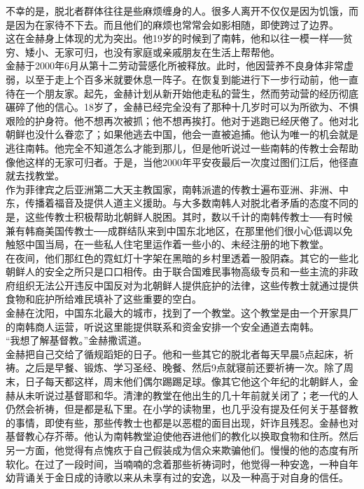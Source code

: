 不幸的是，脱北者群体往往是些麻烦缠身的人。很多人离开不仅仅是因为饥饿，而是因为在家待不下去。而且他们的麻烦也常常会如影相随，即使跨过了边界。\\

这在金赫身上体现的尤为突出。他19岁的时候到了南韩，他和以往一模一样──贫穷、矮小、无家可归，也没有家庭或亲戚朋友在生活上帮帮他。\\

金赫于2000年6月从第十二劳动营感化所被释放。此时，他因营养不良身体非常虚弱，以至于走上个百多米就要休息一阵子。在恢复到能进行下一步行动前，他一直待在一个朋友家。起先，金赫计划从新开始他走私的营生，然而劳动营的经历彻底碾碎了他的信心。18岁了，金赫已经完全没有了那种十几岁时可以为所欲为、不惧艰险的护身符。他不想再次被抓；他不想再挨打。他对于逃跑已经厌倦了。他对北朝鲜也没什么眷恋了；如果他逃去中国，他会一直被追捕。他认为唯一的机会就是逃往南韩。他完全不知道怎么才能到那儿，但是他听说过一些南韩的传教士会帮助像他这样的无家可归者。于是，当他2000年平安夜最后一次度过图们江后，他径直就去找教堂。\\

作为菲律宾之后亚洲第二大天主教国家，南韩派遣的传教士遍布亚洲、非洲、中东，传播着福音及提供人道主义援助。与大多数南韩人对脱北者矛盾的态度不同的是，这些传教士积极帮助北朝鲜人脱困。其时，数以千计的南韩传教士──有时候兼有韩裔美国传教士──成群结队来到中国东北地区，在那里他们很小心低调以免触怒中国当局，在一些私人住宅里运作着一些小的、未经注册的地下教堂。\\

在夜间，他们那红色的霓虹灯十字架在黑暗的乡村里透着一股阴森。其它的一些北朝鲜人的安全之所只是口口相传。由于联合国难民事物高级专员和一些主流的非政府组织无法公开违反中国反对为北朝鲜人提供庇护的法律，这些传教士就通过提供食物和庇护所给难民填补了这些重要的空白。\\

金赫在沈阳，中国东北最大的城市，找到了一个教堂。这个教堂是由一个开家具厂的南韩商人运营，听说这里能提供联系和资金安排一个安全通道去南韩。\\

“我想了解基督教。”金赫撒谎道。\\

金赫把自己交给了循规蹈矩的日子。他和一些其它的脱北者每天早晨5点起床，祈祷。之后是早餐、锻炼、学习圣经、晚餐、然后9点就寝前还要祈祷一次。除了周末，日子每天都这样，周末他们偶尔踢踢足球。像其它他这个年纪的北朝鲜人，金赫从未听说过基督耶和华。清津的教堂在他出生的几十年前就关闭了；老一代的人仍然会祈祷，但是都是私下里。在小学的读物里，也几乎没有提及任何关于基督教的事情，即使有些，那些传教士也都是以恶棍的面目出现，奸诈且残忍。金赫也对基督教心存芥蒂。他认为南韩教堂迫使他吞进他们的教化以换取食物和住所。然后另一方面，他觉得有点愧疚于自己假装成为信众来欺骗他们。慢慢的他的态度有所软化。在过了一段时间，当喃喃的念着那些祈祷词时，他觉得一种安逸，一种自年幼背诵关于金日成的诗歌以来从未享有过的安逸，以及一种高于对自身的信任。\\

